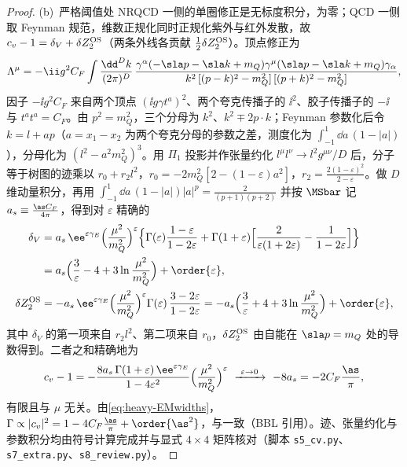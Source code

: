 \begin{proof}
(b)~严格阈值处 NRQCD 一侧的单圈修正是无标度积分，为零；QCD 一侧取 Feynman 规范，维数正规化同时正规化紫外与红外发散，故 $c_v-1=\delta_V+\delta Z_2^{\rm OS}$（两条外线各贡献 $\frac12\delta Z_2^{\rm OS}$）。顶点修正为
\begin{equation}\label{eq:heavy-vertex}
\Lambda^\mu=-\ii g^2C_F\int\frac{\dd^Dk}{(2\pi)^D}\,\frac{\gamma^\alpha(-\sla p-\sla k+m_Q)\gamma^\mu(\sla p-\sla k+m_Q)\gamma_\alpha}{k^2\,[(p-k)^2-m_Q^2]\,[(p+k)^2-m_Q^2]} ,
\end{equation}
因子 $-\ii g^2C_F$ 来自两个顶点 $(\ii g\gamma t^a)^2$、两个夸克传播子的 $\ii^2$、胶子传播子的 $-\ii$ 与 $t^at^a=C_F$。由 $p^2=m_Q^2$，三个分母为 $k^2$、$k^2\mp2p\cdot k$；Feynman 参数化后令 $k=l+ap$（$a=x_1-x_2$ 为两个夸克分母的参数之差，测度化为 $\int_{-1}^1\dd a\,(1-|a|)$），分母化为 $(l^2-a^2m_Q^2)^3$。用 $\Pi_1$ 投影并作张量约化 $l^\mu l^\nu\to l^2g^{\mu\nu}/D$ 后，分子等于树图的迹乘以 $r_0+r_2l^2$，$r_0=-2m_Q^2[2-(1-\varepsilon)a^2]$，$r_2=\frac{2(1-\varepsilon)^2}{2-\varepsilon}$。做 $D$ 维动量积分，再用 $\int_{-1}^1\dd a\,(1-|a|)|a|^{p}=\frac{2}{(p+1)(p+2)}$ 并按 $\MSbar$ 记 $a_s\equiv\frac{\as C_F}{4\pi}$，得到对 $\varepsilon$ 精确的
\begin{align}
\delta_V&=a_s\,\ee^{\varepsilon\gamma_E}\Big(\frac{\mu^2}{m_Q^2}\Big)^{\varepsilon}\Big\{\Gamma(\varepsilon)\frac{1-\varepsilon}{1-2\varepsilon}+\Gamma(1+\varepsilon)\Big[\frac{2}{\varepsilon(1+2\varepsilon)}-\frac{1}{1-2\varepsilon}\Big]\Big\}\notag\\
&=a_s\Big(\frac3\varepsilon-4+3\ln\frac{\mu^2}{m_Q^2}\Big)+\order{\varepsilon},\label{eq:heavy-dV}\\
\delta Z_2^{\rm OS}&=-a_s\,\ee^{\varepsilon\gamma_E}\Big(\frac{\mu^2}{m_Q^2}\Big)^{\varepsilon}\Gamma(\varepsilon)\,\frac{3-2\varepsilon}{1-2\varepsilon}
=-a_s\Big(\frac3\varepsilon+4+3\ln\frac{\mu^2}{m_Q^2}\Big)+\order{\varepsilon},\label{eq:heavy-dZ2}
\end{align}
其中 $\delta_V$ 的第一项来自 $r_2l^2$、第二项来自 $r_0$，$\delta Z_2^{\rm OS}$ 由自能在 $\sla p=m_Q$ 处的导数得到。二者之和精确地为
\begin{equation}\label{eq:heavy-cv-exact}
c_v-1=-\frac{8a_s\,\Gamma(1+\varepsilon)\,\ee^{\varepsilon\gamma_E}}{1-4\varepsilon^2}\Big(\frac{\mu^2}{m_Q^2}\Big)^{\varepsilon}\ \xrightarrow{\ \varepsilon\to0\ }\ -8a_s=-2C_F\frac{\as}{\pi},
\end{equation}
有限且与 $\mu$ 无关。由\cref{eq:heavy-EMwidths}，$\Gamma\propto|c_v|^2=1-4C_F\frac{\as}{\pi}+\order{\as^2}$，与\cite[式~(A37)]{BodwinBraatenLepage1995}一致（BBL 引用\cite{Barbieri:1975ki,Celmaster:1978yz}）。迹、张量约化与参数积分均由符号计算完成并与显式 $4\times4$ 矩阵核对（脚本 \texttt{s5\_\allowbreak cv.py}、\texttt{s7\_\allowbreak extra.py}、\texttt{s8\_\allowbreak review.py}）。
\end{proof}

